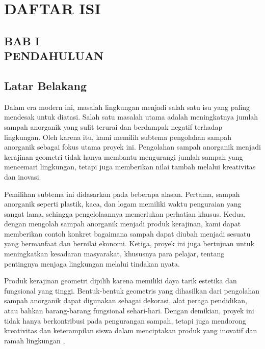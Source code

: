 \documentclass[a4paper,12pt, bahasa]{article}
\begin{document}
    \section*{DAFTAR ISI}
\renewcommand{\cftdot}{.}
\tableofcontents
\pagebreak
\begin{center}
    \section*{BAB I\\PENDAHULUAN}
\end{center}
\setcounter{section}{1}
\subsection{Latar Belakang}
\setcounter{page}{1}
Dalam era modern ini, masalah lingkungan menjadi salah satu isu yang paling mendesak untuk diatasi. Salah satu masalah utama adalah meningkatnya jumlah sampah anorganik yang sulit terurai dan berdampak negatif terhadap lingkungan. Oleh karena itu, kami memilih subtema pengolahan sampah anorganik sebagai fokus utama proyek ini. Pengolahan sampah anorganik menjadi kerajinan geometri tidak hanya membantu mengurangi jumlah sampah yang mencemari lingkungan, tetapi juga memberikan nilai tambah melalui kreativitas dan inovasi. 

Pemilihan subtema ini didasarkan pada beberapa alasan. Pertama, sampah anorganik seperti plastik, kaca, dan logam memiliki waktu penguraian yang sangat lama, sehingga pengelolaannya memerlukan perhatian khusus. Kedua, dengan mengolah sampah anorganik menjadi produk kerajinan, kami dapat memberikan contoh konkret bagaimana sampah dapat diubah menjadi sesuatu yang bermanfaat dan bernilai ekonomi. Ketiga, proyek ini juga bertujuan untuk meningkatkan kesadaran masyarakat, khususnya para pelajar, tentang pentingnya menjaga lingkungan melalui tindakan nyata. 

Produk kerajinan geometri dipilih karena memiliki daya tarik estetika dan fungsional yang tinggi. Bentuk-bentuk geometris yang dihasilkan dari pengolahan sampah anorganik dapat digunakan sebagai dekorasi, alat peraga pendidikan, atau bahkan barang-barang fungsional sehari-hari. Dengan demikian, proyek ini tidak hanya berkontribusi pada pengurangan sampah, tetapi juga mendorong kreativitas dan keterampilan siswa dalam menciptakan produk yang inovatif dan ramah lingkungan \cite{GeometriArt},
\end{document}
